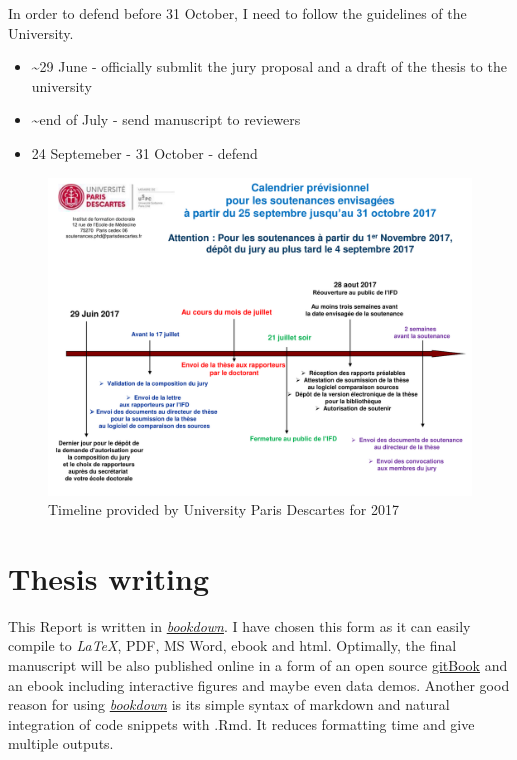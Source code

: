 \documentclass[12pt,]{book}
\providecommand{\tightlist}{%
  \setlength{\itemsep}{0pt}\setlength{\parskip}{0pt}}
\theoremstyle{definition}
\theoremstyle{definition}
\theoremstyle{definition}
\theoremstyle{remark}
\begin{document}
In order to defend before 31 October, I need to follow the guidelines of
the University.

\begin{itemize}
\tightlist
\item
  \textasciitilde{}29 June - officially submlit the jury proposal and a
  draft of the thesis to the university
\item
  \textasciitilde{}end of July - send manuscript to reviewers
\item
  24 Septemeber - 31 October - defend
\end{itemize}

\begin{figure}
\centering
\includegraphics{figures-ext/An-timeline.pdf}
\caption{Timeline provided by University Paris Descartes for 2017}
\end{figure}

\hypertarget{thesis-writing}{%
\section*{Thesis writing}\label{thesis-writing}}

This Report is written in
\href{https://github.com/rstudio/bookdown}{\emph{bookdown}}. I have
chosen this form as it can easily compile to \emph{LaTeX}, PDF, MS Word,
ebook and html. Optimally, the final manuscript will be also published
online in a form of an open source
\href{https://www.gitbook.com/about}{gitBook} and an ebook including
interactive figures and maybe even data demos. Another good reason for
using \href{https://github.com/rstudio/bookdown}{\emph{bookdown}} is its
simple syntax of markdown and natural integration of code snippets with
.Rmd. It reduces formatting time and give multiple outputs.
\end{document}
